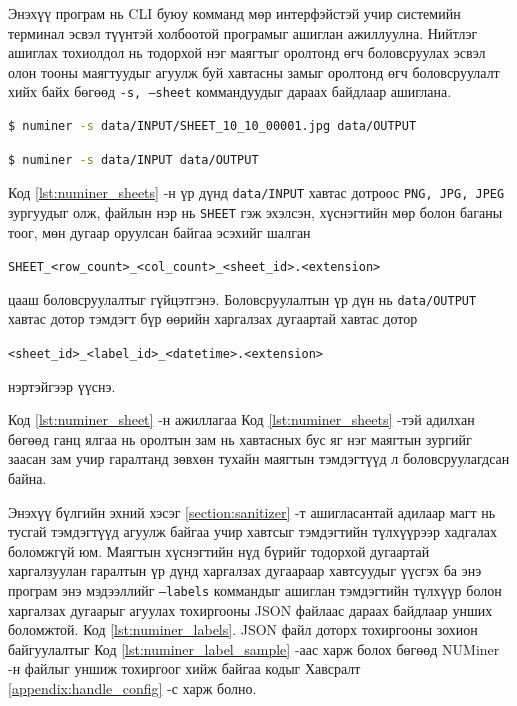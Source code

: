 Энэхүү програм нь CLI буюу комманд мөр интерфэйстэй учир системийн терминал эсвэл түүнтэй холбоотой програмыг ашиглан ажиллуулна. Нийтлэг ашиглах тохиолдол нь тодорхой нэг маягтыг оролтонд өгч боловсруулах эсвэл олон тооны маягтуудыг агуулж буй хавтасны замыг оролтонд өгч боловсруулалт хийх байх бөгөөд \texttt{-s, --sheet} коммандуудыг дараах байдлаар ашиглана.

\begin{lstlisting}[caption={NUMiner --- нэг маягтыг боловсруулах комманд}, label={lst:numiner_sheet}, language=bash, numbers=none]
$ numiner -s data/INPUT/SHEET_10_10_00001.jpg data/OUTPUT
\end{lstlisting}

\begin{lstlisting}[caption={NUMiner --- олон маягтуудыг нэг дор боловсруулах комманд буюу маягтуудыг агуулж буй хавтсын замыг зааж өгөх}, label={lst:numiner_sheets}, language=bash, numbers=none]
$ numiner -s data/INPUT data/OUTPUT
\end{lstlisting}

Код \ref{lst:numiner_sheets} -н үр дүнд \texttt{data/INPUT} хавтас дотроос \texttt{PNG, JPG, JPEG} зургуудыг олж, файлын нэр нь \texttt{SHEET} гэж эхэлсэн, хүснэгтийн мөр болон баганы тоог, мөн дугаар оруулсан байгаа эсэхийг шалган
\begin{center}
	\texttt{SHEET\_<row\_count>\_<col\_count>\_<sheet\_id>.<extension>}
\end{center}
цааш боловсруулалтыг гүйцэтгэнэ. Боловсруулалтын үр дүн нь \texttt{data/OUTPUT} хавтас дотор тэмдэгт бүр өөрийн харгалзах дугаартай хавтас дотор
\begin{center}
	\texttt{<sheet\_id>\_<label\_id>\_<datetime>.<extension>}
\end{center}
нэртэйгээр үүснэ.

Код \ref{lst:numiner_sheet} -н ажиллагаа Код \ref{lst:numiner_sheets} -тэй адилхан бөгөөд ганц ялгаа нь оролтын зам нь хавтасных бус яг нэг маягтын зургийг заасан зам учир гаралтанд зөвхөн тухайн маягтын тэмдэгтүүд л боловсруулагдсан байна.

Энэхүү бүлгийн эхний хэсэг \ref{section:sanitizer} -т ашигласантай адилаар магт нь тусгай тэмдэгтүүд агуулж байгаа учир хавтсыг тэмдэгтийн түлхүүрээр хадгалах боломжгүй юм. Маягтын хүснэгтийн нүд бүрийг тодорхой дугаартай харгалзуулан гаралтын үр дүнд харгалзах дугаараар хавтсуудыг үүсгэх ба энэ програм энэ мэдээллийг \texttt{--labels} коммандыг ашиглан тэмдэгтийн түлхүүр болон харгалзах дугаарыг агуулах тохиргооны JSON файлаас дараах байдлаар унших боломжтой. Код \ref{lst:numiner_labels}. JSON файл доторх тохиргооны зохион байгуулалтыг Код \ref{lst:numiner_label_sample} -аас харж болох бөгөөд NUMiner -н файлыг уншиж тохиргоог хийж байгаа кодыг Хавсралт \ref{appendix:handle_config} -с харж болно.

